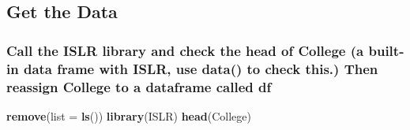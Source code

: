 \documentclass[]{article}
\newenvironment{Shaded}{\begin{snugshade}}{\end{snugshade}}
\newcommand{\DataTypeTok}[1]{\textcolor[rgb]{0.13,0.29,0.53}{#1}}
\newcommand{\KeywordTok}[1]{\textcolor[rgb]{0.13,0.29,0.53}{\textbf{#1}}}
\newcommand{\NormalTok}[1]{#1}
\begin{document}
\hypertarget{get-the-data}{%
\subsection{Get the Data}\label{get-the-data}}

\hypertarget{call-the-islr-library-and-check-the-head-of-college-a-built-in-data-frame-with-islr-use-data-to-check-this.-then-reassign-college-to-a-dataframe-called-df}{%
\subsubsection{Call the ISLR library and check the head of College (a
built-in data frame with ISLR, use data() to check this.) Then reassign
College to a dataframe called
df}\label{call-the-islr-library-and-check-the-head-of-college-a-built-in-data-frame-with-islr-use-data-to-check-this.-then-reassign-college-to-a-dataframe-called-df}}

\begin{Shaded}
\begin{Highlighting}[]
\KeywordTok{remove}\NormalTok{(}\DataTypeTok{list =} \KeywordTok{ls}\NormalTok{())}
\KeywordTok{library}\NormalTok{(ISLR)}
\KeywordTok{head}\NormalTok{(College)}
\end{Highlighting}
\end{Shaded}
\end{document}
